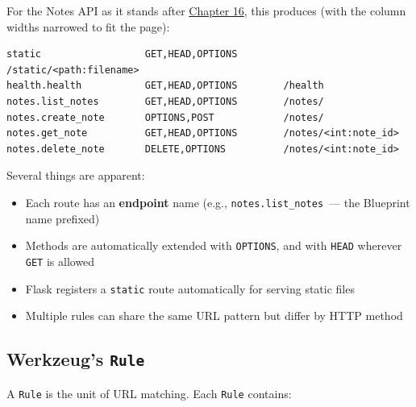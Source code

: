 \noindent{}For the Notes API as it stands after \hyperref[ch:16-logging-error-handling]{Chapter 16}, this produces (with the column widths narrowed to fit the page):

\begin{outputbox}[short]
\begin{Verbatim}[fontsize=\codesize, breaklines, breakanywhere, breaksymbolleft={\tiny\textcolor{muted}{$\hookrightarrow$}}]
static                  GET,HEAD,OPTIONS        /static/<path:filename>
health.health           GET,HEAD,OPTIONS        /health
notes.list_notes        GET,HEAD,OPTIONS        /notes/
notes.create_note       OPTIONS,POST            /notes/
notes.get_note          GET,HEAD,OPTIONS        /notes/<int:note_id>
notes.delete_note       DELETE,OPTIONS          /notes/<int:note_id>
\end{Verbatim}
\end{outputbox}

\noindent{}Several things are apparent:

\begin{itemize}
\tightlist
\item
  Each route has an \textbf{endpoint} name (e.g., \texttt{notes.list\_notes}~--- the Blueprint name prefixed)
\item
  Methods are automatically extended with \texttt{OPTIONS}, and with \texttt{HEAD} wherever \texttt{GET} is allowed
\item
  Flask registers a \texttt{static} route automatically for serving static files
\item
  Multiple rules can share the same URL pattern but differ by HTTP method
\end{itemize}

\subsection*{\texorpdfstring{Werkzeug's \texttt{Rule}}{Werkzeug's Rule}}\label{32-routing:werkzeugs-rule}

A \texttt{Rule} is the unit of URL matching. Each \texttt{Rule} contains:

\begin{codebox}[short]

\begin{Shaded}
\begin{Highlighting}[]
\end{Highlighting}
\end{Shaded}

\end{codebox}


